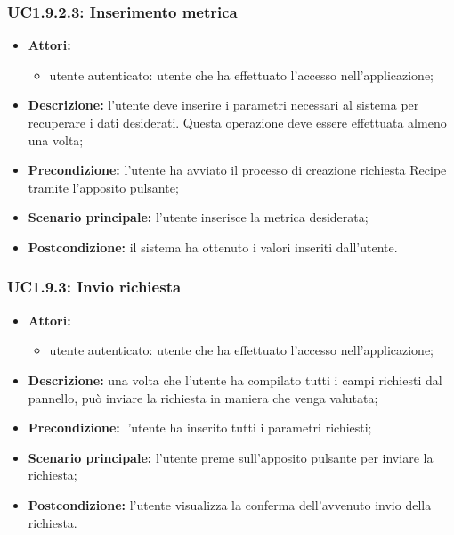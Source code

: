 \subsubsection{UC1.9.2.3: Inserimento metrica}
\begin{itemize}
	\item \textbf{Attori:}
	\begin{itemize}
		\item utente autenticato: utente che ha effettuato l'accesso nell'applicazione;
	\end{itemize}
	\item \textbf{Descrizione:} l'utente deve inserire i parametri necessari al sistema per recuperare i dati desiderati. Questa operazione deve essere effettuata almeno una volta;
	\item \textbf{Precondizione:} l'utente ha avviato il processo di creazione richiesta Recipe tramite l'apposito pulsante;
	\item \textbf{Scenario principale:} l'utente inserisce la metrica desiderata;
	\item \textbf{Postcondizione:} il sistema ha ottenuto i valori inseriti dall'utente.
\end{itemize}

\subsubsection{UC1.9.3: Invio richiesta}
\begin{itemize}
	\item \textbf{Attori:}
	\begin{itemize}
		\item utente autenticato: utente che ha effettuato l'accesso nell'applicazione;
	\end{itemize}
	\item \textbf{Descrizione:} una volta che l'utente ha compilato tutti i campi richiesti dal pannello, può inviare la richiesta in maniera che venga valutata;
	\item \textbf{Precondizione:} l'utente ha inserito tutti i parametri richiesti;
	\item \textbf{Scenario principale:} l'utente preme sull'apposito pulsante per inviare la richiesta;
	\item \textbf{Postcondizione:} l'utente visualizza la conferma dell'avvenuto invio della richiesta.
\end{itemize}

